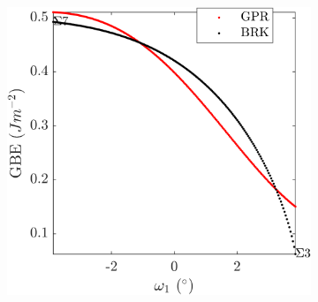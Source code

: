 \documentclass[final,twocolumn,12pt]{elsarticle}
\begin{document}
\begin{figure}[!htb]
\begin{subfigure}[b]{0.48\textwidth}
			\includegraphics[width=\textwidth]{figures/tunnel-3-7.png}
			\caption{}
			\label{fig:tunnel-3-7}
		\end{subfigure}
		

\end{figure}
\end{document}
